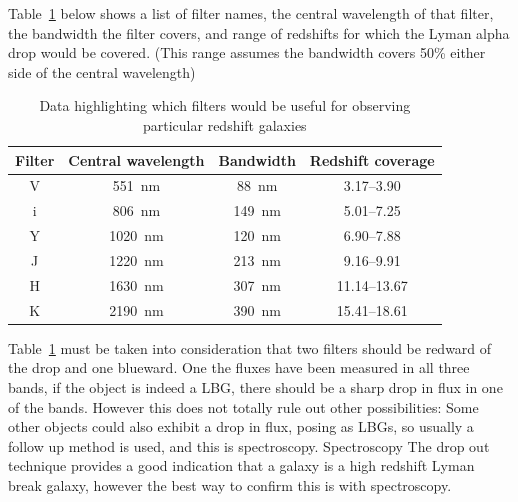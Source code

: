 			Table~\ref{tab:filter_characteristics} below shows a list of filter names, the central wavelength of that filter, the bandwidth the filter covers, and range of redshifts for which the Lyman alpha drop would be covered. (This  range assumes the bandwidth covers 50\% either side of the central wavelength)
			\begin{table}[!htbp]
				\begin{center}
					\begin{tabular}{c|c|c|c}
						Filter 	& Central wavelength & Bandwidth & Redshift coverage \\
						\hline \hline
						V 	& \SI{551}{\nano\metre}	 & \SI{88}{\nano\metre} & 3.17--3.90 \\
						i 	& \SI{806}{\nano\metre}	 & \SI{149}{\nano\metre} & 5.01--7.25 \\
						Y 	& \SI{1020}{\nano\metre} & \SI{120}{\nano\metre} & 6.90--7.88 \\
						J 	& \SI{1220}{\nano\metre} & \SI{213}{\nano\metre} & 9.16--9.91 \\
						H 	& \SI{1630}{\nano\metre} & \SI{307}{\nano\metre} & 11.14--13.67 \\
						K 	& \SI{2190}{\nano\metre} & \SI{390}{\nano\metre} & 15.41--18.61
					\end{tabular}
				\end{center}
				\caption{Data highlighting which filters would be useful for observing particular redshift galaxies\cite{Galactic_Astronomy_Binney_Merrifield}}
				\label{tab:filter_characteristics}
			\end{table}

			Table~\ref{tab:filter_characteristics} must be taken into consideration that two filters should be redward of the drop and one blueward. One the fluxes have been measured in all three bands, if the object is indeed a LBG, there should be a sharp drop in flux in  one of the bands. However this does not totally rule out other possibilities: Some other objects could also exhibit a drop in flux, posing as LBGs, so usually a follow up method is used, and this is spectroscopy. Spectroscopy The drop out technique provides a good indication that a galaxy is a high redshift Lyman break galaxy, however the best way to confirm this is with spectroscopy.

